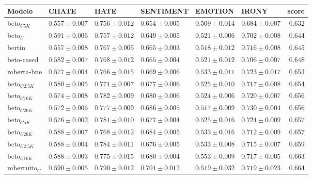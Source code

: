 \begin{sidewaystable}
    \centering
    \large
    \begin{tabular}{llllllr}
        \toprule
        Modelo             & CHATE                   &  HATE              &  SENTIMENT        &  EMOTION          &  IRONY            &     score \\
        \midrule
        beto$_{U5K}$   & $0.557 \pm 0.007$ & $0.756 \pm 0.012$ & $0.654 \pm 0.005$ & $0.509 \pm 0.014$ & $0.684 \pm 0.007$ &  0.632 \\
        beto$_U$        & $0.591 \pm 0.006$ & $0.757 \pm 0.012$ & $0.649 \pm 0.005$ & $0.521 \pm 0.006$ & $0.702 \pm 0.008$ &  0.644 \\
        bertin          & $0.557 \pm 0.008$ & $0.767 \pm 0.005$ & $0.665 \pm 0.003$ & $0.518 \pm 0.012$ & $0.716 \pm 0.008$ &  0.645 \\
        beto-cased      & $0.582 \pm 0.007$ & $0.768 \pm 0.012$ & $0.665 \pm 0.004$ & $0.521 \pm 0.012$ & $0.706 \pm 0.007$ &  0.648 \\
        roberta-bne     & $0.577 \pm 0.004$ & $0.766 \pm 0.015$ & $0.669 \pm 0.006$ & $0.533 \pm 0.011$ & $0.723 \pm 0.017$ &  0.653 \\
        beto$_{C2.5K}$  & $0.580 \pm 0.005$ & $0.771 \pm 0.007$ & $0.677 \pm 0.006$ & $0.525 \pm 0.010$ & $0.717 \pm 0.008$ &  0.654 \\
        beto$_{C10K}$   & $0.574 \pm 0.008$ & $0.782 \pm 0.009$ & $0.680 \pm 0.006$ & $0.524 \pm 0.006$ & $0.720 \pm 0.007$ &  0.656 \\
        beto$_{C20K}$   & $0.572 \pm 0.006$ & $0.777 \pm 0.009$ & $0.686 \pm 0.005$ & $0.517 \pm 0.009$ & $0.730 \pm 0.004$ &  0.656 \\
        beto$_{C5K}$    & $0.576 \pm 0.002$ & $0.781 \pm 0.010$ & $0.677 \pm 0.004$ & $0.525 \pm 0.016$ & $0.724 \pm 0.009$ &  0.657 \\
        beto$_{U20K}$   & $0.588 \pm 0.007$ & $0.768 \pm 0.012$ & $0.684 \pm 0.005$ & $0.533 \pm 0.016$ & $0.712 \pm 0.009$ &  0.657 \\
        beto$_{U2.5K}$  & $0.588 \pm 0.004$ & $0.784 \pm 0.011$ & $0.676 \pm 0.005$ & $0.533 \pm 0.008$ & $0.715 \pm 0.007$ &  0.659 \\
        beto$_{U10K}$   & $0.588 \pm 0.003$ & $0.775 \pm 0.015$ & $0.680 \pm 0.004$ & $0.553 \pm 0.009$ & $0.717 \pm 0.005$ &  0.663 \\
        robertuito$_C$  & $0.590 \pm 0.005$ & $0.790 \pm 0.012$ & $0.701 \pm 0.012$ & $0.519 \pm 0.032$ & $0.719 \pm 0.023$ &  0.664 \\

\end{tabular}
\end{sidewaystable}
